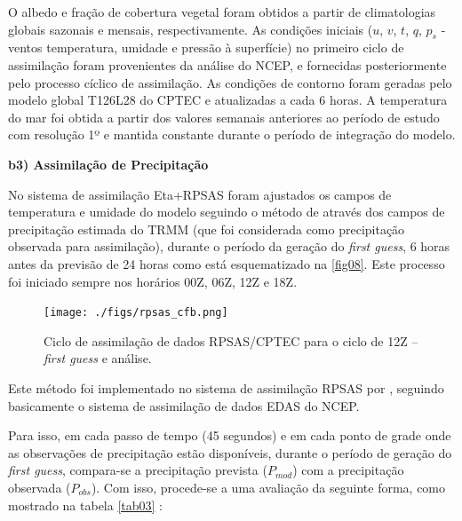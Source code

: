 O albedo e fração de cobertura vegetal foram obtidos a partir de climatologias globais sazonais e mensais, respectivamente. As condições iniciais ($u$, $v$, $t$, $q$, $p_{s}$ - ventos temperatura, umidade e pressão à superfície) no primeiro ciclo de assimilação foram provenientes da análise do NCEP, e fornecidas posteriormente pelo processo cíclico de assimilação.  As condições de contorno foram geradas pelo modelo global T126L28 do CPTEC e atualizadas a cada 6 horas. A temperatura do mar foi obtida a partir dos valores semanais anteriores ao período de estudo com resolução 1º e mantida constante durante o período de integração do modelo.

\textbf{b3) Assimilação de Precipitação}

No sistema de assimilação Eta+RPSAS foram ajustados os campos de temperatura e umidade do modelo seguindo o método de  através dos campos de precipitação estimada do TRMM (que foi considerada como precipitação observada para assimilação), durante o período da geração do \textit{first guess}, 6 horas antes da previsão de 24 horas como está esquematizado na \autoref{fig08}. Este processo foi iniciado sempre nos horários 00Z, 06Z, 12Z e 18Z.

\begin{figure}
\centering
\texttt{[image: ./figs/rpsas\_cfb.png]}
\caption{Ciclo de assimilação de dados RPSAS/CPTEC para o ciclo de 12Z – \textit{first guess} e análise.}
\label{fig08}
\end{figure}

Este método foi implementado no sistema de assimilação RPSAS por , seguindo basicamente o sistema de assimilação de dados EDAS do NCEP.

Para isso, em cada passo de tempo (45 segundos) e em cada ponto de grade onde as observações de precipitação estão disponíveis, durante o período de geração do \textit{first guess}, compara-se a precipitação prevista ($P_{mod}$) com a precipitação observada ($P_{obs}$). Com isso, procede-se a uma avaliação da seguinte forma, como mostrado na tabela \autoref{tab03} \cite{linetal01}:

